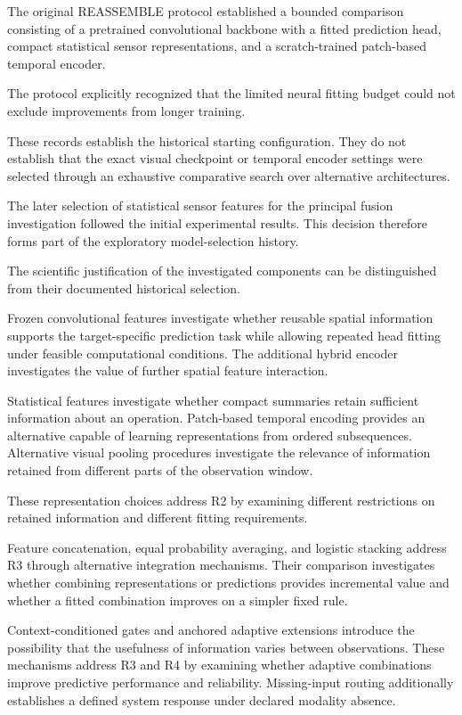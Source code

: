 The original REASSEMBLE protocol established a bounded comparison consisting of a pretrained convolutional backbone with a fitted prediction head, compact statistical sensor representations, and a scratch-trained patch-based temporal encoder.

The protocol explicitly recognized that the limited neural fitting budget could not exclude improvements from longer training.

These records establish the historical starting configuration. They do not establish that the exact visual checkpoint or temporal encoder settings were selected through an exhaustive comparative search over alternative architectures.

The later selection of statistical sensor features for the principal fusion investigation followed the initial experimental results. This decision therefore forms part of the exploratory model-selection history.

The scientific justification of the investigated components can be distinguished from their documented historical selection.

Frozen convolutional features investigate whether reusable spatial information supports the target-specific prediction task while allowing repeated head fitting under feasible computational conditions. The additional hybrid encoder investigates the value of further spatial feature interaction.

Statistical features investigate whether compact summaries retain sufficient information about an operation. Patch-based temporal encoding provides an alternative capable of learning representations from ordered subsequences. Alternative visual pooling procedures investigate the relevance of information retained from different parts of the observation window.

These representation choices address R2 by examining different restrictions on retained information and different fitting requirements.

Feature concatenation, equal probability averaging, and logistic stacking address R3 through alternative integration mechanisms. Their comparison investigates whether combining representations or predictions provides incremental value and whether a fitted combination improves on a simpler fixed rule.

Context-conditioned gates and anchored adaptive extensions introduce the possibility that the usefulness of information varies between observations. These mechanisms address R3 and R4 by examining whether adaptive combinations improve predictive performance and reliability. Missing-input routing additionally establishes a defined system response under declared modality absence.

